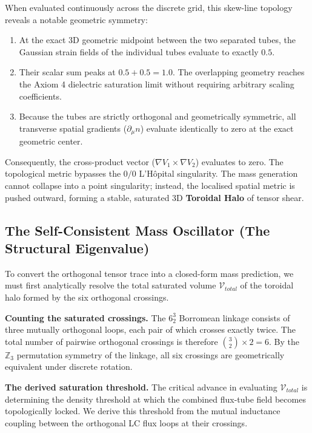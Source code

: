 When evaluated continuously across the discrete grid, this skew-line topology reveals a notable geometric symmetry:
\begin{enumerate}
    \item At the exact 3D geometric midpoint between the two separated tubes, the Gaussian strain fields of the individual tubes evaluate to exactly $0.5$. 
    \item Their scalar sum peaks at $0.5 + 0.5 = \mathbf{1.0}$. The overlapping geometry reaches the Axiom 4 dielectric saturation limit without requiring arbitrary scaling coefficients.
    \item Because the tubes are strictly orthogonal and geometrically symmetric, all transverse spatial gradients ($\partial_\mu n$) evaluate identically to zero at the exact geometric center.
\end{enumerate}

Consequently, the cross-product vector ($\nabla V_1 \times \nabla V_2$) evaluates to zero. The topological metric bypasses the $0/0$ L'Hôpital singularity. The mass generation cannot collapse into a point singularity; instead, the localised spatial metric is pushed outward, forming a stable, saturated 3D \textbf{Toroidal Halo} of tensor shear.

\subsection{The Self-Consistent Mass Oscillator (The Structural Eigenvalue)}
To convert the orthogonal tensor trace into a closed-form mass prediction, we must first analytically resolve the total saturated volume $\mathcal{V}_{total}$ of the toroidal halo formed by the six orthogonal crossings.

\textbf{Counting the saturated crossings.} The $6^3_2$ Borromean linkage consists of three mutually orthogonal loops, each pair of which crosses exactly twice. The total number of pairwise orthogonal crossings is therefore $\binom{3}{2} \times 2 = 6$. By the $\mathbb{Z}_3$ permutation symmetry of the linkage, all six crossings are geometrically equivalent under discrete rotation.

\textbf{The derived saturation threshold.} The critical advance in evaluating $\mathcal{V}_{total}$ is determining the density threshold at which the combined flux-tube field becomes topologically locked. We derive this threshold from the mutual inductance coupling between the orthogonal LC flux loops at their crossings.

